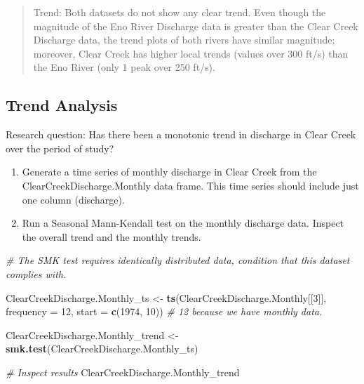 \documentclass[]{article}
\newenvironment{Shaded}{\begin{snugshade}}{\end{snugshade}}
\newcommand{\CommentTok}[1]{\textcolor[rgb]{0.56,0.35,0.01}{\textit{#1}}}
\newcommand{\DataTypeTok}[1]{\textcolor[rgb]{0.13,0.29,0.53}{#1}}
\newcommand{\DecValTok}[1]{\textcolor[rgb]{0.00,0.00,0.81}{#1}}
\newcommand{\KeywordTok}[1]{\textcolor[rgb]{0.13,0.29,0.53}{\textbf{#1}}}
\newcommand{\NormalTok}[1]{#1}
\newcommand{\StringTok}[1]{\textcolor[rgb]{0.31,0.60,0.02}{#1}}
\providecommand{\tightlist}{%
  \setlength{\itemsep}{0pt}\setlength{\parskip}{0pt}}
\begin{document}
\begin{quote}
Trend: Both datasets do not show any clear trend. Even though the
magnitude of the Eno River Discharge data is greater than the Clear
Creek Discharge data, the trend plots of both rivers have similar
magnitude; moreover, Clear Creek has higher local trends (values over
300 ft/s) than the Eno River (only 1 peak over 250 ft/s).
\end{quote}

\hypertarget{trend-analysis}{%
\subsection{Trend Analysis}\label{trend-analysis}}

Research question: Has there been a monotonic trend in discharge in
Clear Creek over the period of study?

\begin{enumerate}
\def\labelenumi{\arabic{enumi}.}
\setcounter{enumi}{10}
\tightlist
\item
  Generate a time series of monthly discharge in Clear Creek from the
  ClearCreekDischarge.Monthly data frame. This time series should
  include just one column (discharge).
\item
  Run a Seasonal Mann-Kendall test on the monthly discharge data.
  Inspect the overall trend and the monthly trends.
\end{enumerate}

\begin{Shaded}
\begin{Highlighting}[]
\CommentTok{# The SMK test requires identically distributed data, condition that this dataset complies with.}

\NormalTok{ClearCreekDischarge.Monthly_ts <-}\StringTok{ }\KeywordTok{ts}\NormalTok{(ClearCreekDischarge.Monthly[[}\DecValTok{3}\NormalTok{]], }
                                     \DataTypeTok{frequency =} \DecValTok{12}\NormalTok{, }\DataTypeTok{start =} \KeywordTok{c}\NormalTok{(}\DecValTok{1974}\NormalTok{, }\DecValTok{10}\NormalTok{)) }
\CommentTok{# 12 because we have monthly data.}


\NormalTok{ClearCreekDischarge.Monthly_trend <-}\StringTok{ }\KeywordTok{smk.test}\NormalTok{(ClearCreekDischarge.Monthly_ts)}

\CommentTok{# Inspect results}
\NormalTok{ClearCreekDischarge.Monthly_trend}
\end{Highlighting}
\end{Shaded}
\end{document}
